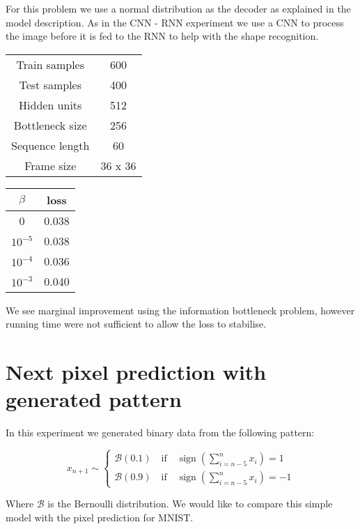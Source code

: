 \documentclass[11pt,oneside,openright]{report}
\DeclareMathOperator{\sign}{sign}
\begin{document}
For this problem we use a normal distribution as the decoder as explained in the model description. As in the CNN - RNN experiment we use a CNN to process the image before it is fed to the RNN to help with the shape recognition.

\begin{minipage}{0.5\textwidth}
        \centering
\begin{tabular}{ c | c  }
 Train samples & 600 \\
 Test samples & 400 \\
 Hidden units & 512 \\
 Bottleneck size & 256 \\
 Sequence length & 60 \\
 Frame size & 36 x 36
\end{tabular}
    \end{minipage}\hfill
    \begin{minipage}{0.5\textwidth}
        \centering
\begin{tabular}{ c | c }
 $\beta$ &  loss \\
 \hline
0  & 0.038 \\
$10^{-5}$  & 0.038 \\
$10^{-4}$  & 0.036 \\
$10^{-3}$  & 0.040 \\
\end{tabular}
\end{minipage}

We see marginal improvement using the information bottleneck problem, however running time were not sufficient to allow the loss to stabilise. 

\section{Next pixel prediction with generated pattern}
In this experiment we generated binary data from the following pattern:

\begin{equation}
 x_{n+1} \sim 
     \begin{cases}
	\mathcal{B}(0.1)\quad \text{if} \quad\sign(\sum_{i = n - 5}^n x_i) = 1\\
	\mathcal{B}(0.9)\quad \text{if} \quad\sign(\sum_{i = n - 5}^n x_i) = -1
    \end{cases}
 \end{equation}
 
 Where $\mathcal{B}$ is the Bernoulli distribution. We would like to compare this simple model with the pixel prediction for MNIST.
 
\end{document}
